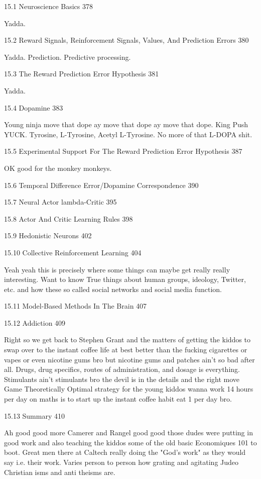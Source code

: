 15.1 Neuroscience Basics 378

Yadda.

15.2 Reward Signals, Reinforcement Signals, Values, And Prediction Errors 380

Yadda. Prediction. Predictive processing.

15.3 The Reward Prediction Error Hypothesis 381

Yadda.

15.4 Dopamine 383

Young ninja move that dope ay move that dope ay move that dope. King Push YUCK. Tyrosine, L-Tyrosine, Acetyl L-Tyrosine. No more of that L-DOPA shit.

15.5 Experimental Support For The Reward Prediction Error Hypothesis 387

OK good for the monkey monkeys.

15.6 Temporal Difference Error/Dopamine Correspondence 390



15.7 Neural Actor lambda-Critic 395



15.8 Actor And Critic Learning Rules 398



15.9 Hedonistic Neurons 402



15.10 Collective Reinforcement Learning 404

Yeah yeah this is precisely where some things can maybe get really really interesting. Want to know True things about human groups, ideology, Twitter, etc. and how these so called social networks and social media function.

15.11 Model-Based Methods In The Brain 407



15.12 Addiction 409

Right so we get back to Stephen Grant and the matters of getting the kiddos to swap over to the instant coffee life at best better than the fucking cigarettes or vapes or even nicotine gums bro but nicotine gums and patches ain't so bad after all. Drugs, drug specifics, routes of administration, and dosage is everything. Stimulants ain't stimulants bro the devil is in the details and the right move Game Theoretically Optimal strategy for the young kiddos wanna work 14 hours per day on maths is to start up the instant coffee habit eat 1 per day bro.

15.13 Summary 410

Ah good good more Camerer and Rangel good good those dudes were putting in good work and also teaching the kiddos some of the old basic Economiques 101 to boot. Great men there at Caltech really doing the "God's work" as they would say i.e. their work. Varies person to person how grating and agitating Judeo Christian isms and anti theisms are.

